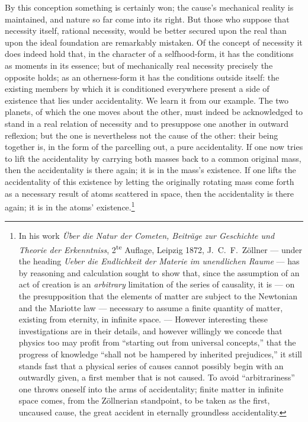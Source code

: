 \documentclass[12pt,a4paper]{book}
\begin{document}
By this conception something is certainly won; the cause's mechanical reality is maintained, and
nature so far come into its right. But those who suppose that necessity itself, rational
necessity, would be better secured upon the real than upon the ideal foundation are remarkably
mistaken. Of the concept of necessity it does indeed hold that, in the character of a
selfhood-form, it has the conditions as moments in its essence; but of mechanically real necessity
precisely the opposite holds; as an otherness-form it has the conditions outside itself: the
existing members by which it is conditioned everywhere present a side of existence that lies under
accidentality. We learn it from our example. The two planets, of which the one moves about the
other, must indeed be acknowledged to stand in a real relation of necessity and to presuppose one
another in outward reflexion; but the one is nevertheless not the cause of the other: their being
together is, in the form of the parcelling out, a pure accidentality. If one now tries to lift the
accidentality by carrying both masses back to a common original mass, then the accidentality is
there again; it is in the mass's existence. If one lifts the accidentality of this existence by
letting the originally rotating
mass come forth as a necessary result of atoms scattered in space, then the accidentality is there
again; it is in the atoms' existence.\footnote{%
In his work \textit{Über die Natur der Cometen, Beiträge zur Geschichte und Theorie der
Erkenntniss}, 2\textsuperscript{te} Auflage, Leipzig 1872, J.\ C.\ F.\ Zöllner --- under the heading
\textit{Ueber die Endlichkeit der Materie im unendlichen Raume} --- has by reasoning and calculation
sought to show that, since the assumption of an act of creation is an \emph{arbitrary} limitation of
the series of causality, it is --- on the presupposition that the elements of matter are subject to
the Newtonian and the Mariotte law --- necessary to assume a finite quantity of matter, existing
from eternity, in infinite space. --- However interesting these investigations are in their details,
and however willingly we concede that physics too may profit from ``starting out from universal
concepts,'' that the progress of knowledge ``shall not be hampered by inherited prejudices,'' it
still stands fast that a physical series of causes cannot possibly begin with an outwardly given, a
first member that is not caused. To avoid ``arbitrariness'' one throws oneself into the arms of
accidentality; finite matter in infinite space comes, from the Zöllnerian standpoint, to be taken as
the first, uncaused cause, the great accident in eternally groundless accidentality.}
\end{document}
